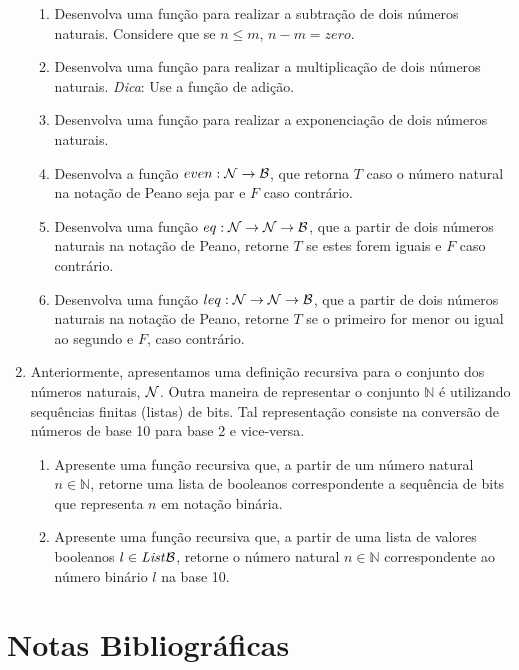 \begin{enumerate}
  \begin{enumerate}
       \item Desenvolva uma função para realizar a subtração de dois números naturais. Considere que se $n \leq m$, $n - m = zero$.
       \item Desenvolva uma função para realizar a multiplicação de dois números naturais. \textit{Dica}: Use a função de adição.
       \item Desenvolva uma função para realizar a exponenciação de dois números naturais.
       \item Desenvolva a função $even : \mathcal{N}\to\mathcal{B}$, que retorna $T$ caso o número natural na notação de Peano seja par e $F$ caso contrário.
       \item Desenvolva uma função $eq : \mathcal{N} \to \mathcal{N} \to \mathcal{B}$, que a partir de dois números naturais na notação de Peano, retorne $T$ se estes forem iguais e $F$ caso contrário.
       \item Desenvolva uma função $leq : \mathcal{N} \to \mathcal{N} \to \mathcal{B}$, que a partir de dois números naturais na notação de Peano, retorne $T$ se o primeiro for menor ou igual ao segundo e $F$, caso contrário.
  \end{enumerate}
  \item Anteriormente, apresentamos uma definição recursiva para o conjunto dos números naturais, $\mathcal{N}$. Outra maneira de representar o conjunto $\mathbb{N}$
           é utilizando sequências finitas (listas) de bits. Tal representação consiste na conversão de números de base 10 para base 2 e vice-versa.
 \begin{enumerate}
      \item Apresente uma função recursiva que, a partir de um número natural $n \in \mathbb{N}$, retorne uma lista de booleanos correspondente a sequência de bits
               que representa $n$ em notação binária.
      \item Apresente uma função recursiva que, a partir de uma lista de valores booleanos $l \in \textit{List\/}\mathcal{B}$, retorne o número natural $n \in \mathbb{N}$
               correspondente ao número binário $l$ na base 10.
 \end{enumerate}
\end{enumerate}


\section{Notas Bibliogr\'aficas}

